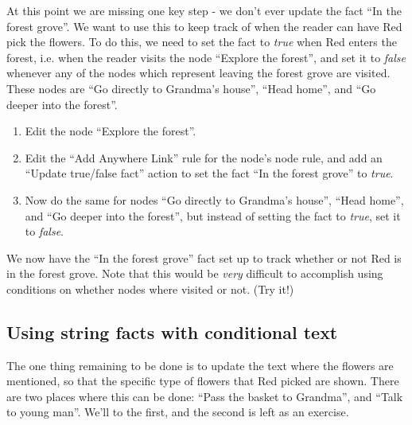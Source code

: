 \documentclass{article}
\begin{document}
At this point we are missing one key step - we don't ever update the fact ``In the forest grove''. We want to use this to keep track of when the reader can have Red pick the flowers. To do this, we need to set the fact to \textit{true} when Red enters the forest, i.e. when the reader visits the node ``Explore the forest'', and set it to \textit{false} whenever any of the nodes which represent leaving the forest grove are visited. These nodes are ``Go directly to Grandma's house'', ``Head home'', and ``Go deeper into the forest''.

\begin{enumerate}
  \item Edit the node ``Explore the forest''.
  \item Edit the ``Add Anywhere Link'' rule for the node's node rule, and add an ``Update true/false fact'' action to set the fact ``In the forest grove'' to \textit{true}.
  \item Now do the same for nodes ``Go directly to Grandma's house'', ``Head home'', and ``Go deeper into the forest'', but instead of setting the fact to \textit{true}, set it to \textit{false}.
\end{enumerate}

We now have the ``In the forest grove'' fact set up to track whether or not Red is in the forest grove. Note that this would be \textit{very} difficult to accomplish using conditions on whether nodes where visited or not. (Try it!)

\subsection{Using string facts with conditional text}

The one thing remaining to be done is to update the text where the flowers are mentioned, so that the specific type of flowers that Red picked are shown. There are two places where this can be done: ``Pass the basket to Grandma'', and ``Talk to young man''. We'll to the first, and the second is left as an exercise.
\end{document}
